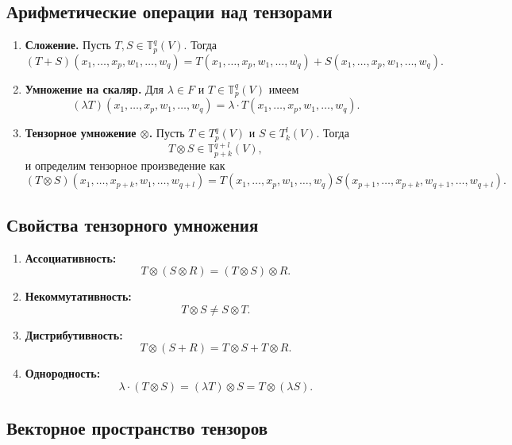 \documentclass[12pt]{article}
\begin{document}
\subsection{Арифметические операции над тензорами}

\begin{enumerate}
    \item \textbf{Сложение.} Пусть $T, S \in \mathbb{T}^q_p(V)$. Тогда
    \[
    (T + S)(x_1, \ldots, x_p, w_1, \ldots, w_q) = T(x_1, \ldots, x_p, w_1, \ldots, w_q) + S(x_1, \ldots, x_p, w_1, \ldots, w_q).
    \]

    \item \textbf{Умножение на скаляр.} Для $\lambda \in F$ и $T \in \mathbb{T}^q_p(V)$ имеем
    \[
    (\lambda T)(x_1, \ldots, x_p, w_1, \ldots, w_q) = \lambda \cdot T(x_1, \ldots, x_p, w_1, \ldots, w_q).
    \]

    \item \textbf{Тензорное умножение $\otimes$.} Пусть $T \in T^q_p(V)$ и $S \in T^l_k(V)$. Тогда
    \[
    T \otimes S \in \mathbb{T}^{q+l}_{p+k}(V),
    \]
    и определим тензорное произведение как
    \[
    (T \otimes S)(x_1, \ldots, x_{p+k}, w_1, \ldots, w_{q+l}) = T(x_1, \ldots, x_p, w_1, \ldots, w_q) S(x_{p+1}, \ldots, x_{p+k}, w_{q+1}, \ldots, w_{q+l}).
    \]
\end{enumerate}

\subsection{Свойства тензорного умножения}

\begin{enumerate}
    \item \textbf{Ассоциативность:}
    \[
    T \otimes (S \otimes R) = (T \otimes S) \otimes R.
    \]

    \item \textbf{Некоммутативность:}
    \[
    T \otimes S \neq S \otimes T.
    \]

    \item \textbf{Дистрибутивность:}
    \[
    T \otimes (S + R) = T \otimes S + T \otimes R.
    \]

    \item \textbf{Однородность:}
    \[
    \lambda \cdot (T \otimes S) = (\lambda T) \otimes S = T \otimes (\lambda S).
    \]
\end{enumerate}

\subsection{Векторное пространство тензоров}
\end{document}
